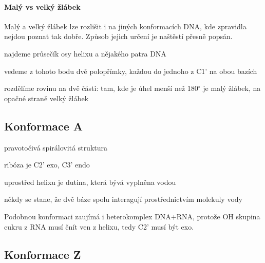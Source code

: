 \documentclass[DIV=8]{scrreprt}
\newcommand{\mybox}[2]{
    \paragraph{#1} #2
}
\begin{document}
\mybox{Malý vs velký žlábek}{Malý a velký žlábek lze rozlišit i na jiných konformacích DNA, kde zpravidla nejdou poznat tak dobře. Způsob jejich určení je naštěstí přesně popsán.
\begin{myEnumerate}[nosep]
    \item najdeme průsečík osy helixu a nějakého patra DNA
    \item vedeme z tohoto bodu dvě polopřímky, každou do jednoho z C1' na obou bazích
    \item rozdělíme rovinu na dvě části: tam, kde je úhel menší než 180\(^{\circ}\) je malý žlábek, na opačné straně velký žlábek
\end{myEnumerate}

}



\subsection{Konformace A} \label{Konformace A}


\begin{myItemize}[nosep]
    \item pravotočivá spirálovitá struktura
    \item ribóza je  C2' exo, C3' endo
    \item uprostřed helixu je dutina, která bývá vyplněna vodou
\begin{myItemize}[nosep]
    \item někdy se stane, že dvě báze spolu interagují prostřednictvím molekuly vody
\end{myItemize}

\end{myItemize}



Podobnou konformaci zaujímá i heterokomplex DNA+RNA, protože OH skupina cukru z RNA musí čnít ven z helixu, tedy C2' musí být exo.

\subsection{Konformace Z} \label{Konformace Z}
\end{document}
